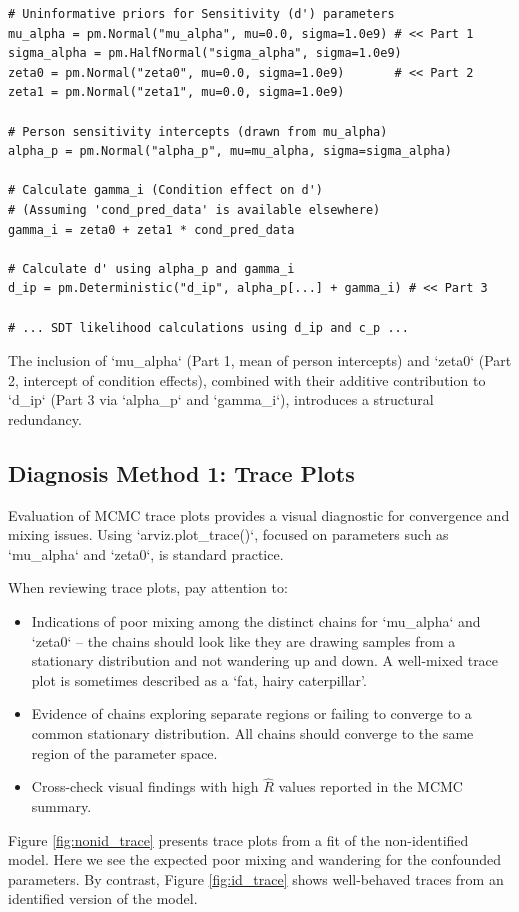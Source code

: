 \documentclass[12pt]{article}
\begin{document}
\begin{lstlisting}[label=lst:nonid_sdt_code, caption={PyMC code snippet for the non-identified SDT model parameters.}]
# Uninformative priors for Sensitivity (d') parameters
mu_alpha = pm.Normal("mu_alpha", mu=0.0, sigma=1.0e9) # << Part 1
sigma_alpha = pm.HalfNormal("sigma_alpha", sigma=1.0e9)
zeta0 = pm.Normal("zeta0", mu=0.0, sigma=1.0e9)       # << Part 2
zeta1 = pm.Normal("zeta1", mu=0.0, sigma=1.0e9)

# Person sensitivity intercepts (drawn from mu_alpha)
alpha_p = pm.Normal("alpha_p", mu=mu_alpha, sigma=sigma_alpha)

# Calculate gamma_i (Condition effect on d')
# (Assuming 'cond_pred_data' is available elsewhere)
gamma_i = zeta0 + zeta1 * cond_pred_data

# Calculate d' using alpha_p and gamma_i
d_ip = pm.Deterministic("d_ip", alpha_p[...] + gamma_i) # << Part 3

# ... SDT likelihood calculations using d_ip and c_p ...
\end{lstlisting}
The inclusion of `mu\_alpha` (Part 1, mean of person intercepts) and `zeta0` (Part 2, intercept of condition effects), combined with their additive contribution to `d\_ip` (Part 3 via `alpha\_p` and `gamma\_i`), introduces a structural redundancy.

\subsection*{Diagnosis Method 1: Trace Plots}

Evaluation of MCMC trace plots provides a visual diagnostic for convergence and mixing issues. Using `arviz.plot\_trace()`, focused on parameters such as `mu\_alpha` and `zeta0`, is standard practice.

When reviewing trace plots, pay attention to:
\begin{itemize}[label=--, itemsep=1ex]
    \item Indications of poor mixing among the distinct chains for `mu\_alpha` and `zeta0` -- the chains should look like they are drawing samples from a stationary distribution and not wandering up and down.  A well-mixed trace plot is sometimes described as a `fat, hairy caterpillar'.
    \item Evidence of chains exploring separate regions or failing to converge to a common stationary distribution.  All chains should converge to the same region of the parameter space.
    \item Cross-check visual findings with high $\hat{R}$ values reported in the MCMC summary.
\end{itemize}
Figure \ref{fig:nonid_trace} presents trace plots from a fit of the non-identified model. Here we see the expected poor mixing and wandering for the confounded parameters. By contrast, Figure \ref{fig:id_trace} shows well-behaved traces from an identified version of the model.
\end{document}
